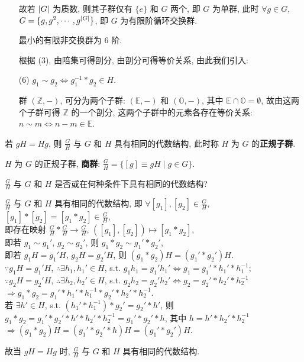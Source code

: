 \documentclass{note}
\begin{document}
\begin{itemize}
    故若 $\left\lvert G\right\rvert$ 为质数, 则其子群仅有 $\{e\}$ 和 $G$ 两个, 即 $G$ 为单群, 此时 $\forall g\in G$, $G=\{g,g^2,\cdots,g^{\left\lvert G\right\rvert}\}$, 即 $G$ 为有限阶循环交换群.

    最小的有限非交换群为 $6$ 阶.

    根据 (3), 由陪集可得剖分, 由剖分可得等价关系, 由此我们引入:
    \item[(6)] $g_1\sim g_2\Longleftrightarrow g_1^{-1}*g_2\in H$.
    \begin{eg}
        群 $(\mathbb{Z},-)$, 可分为两个子群: $(\mathbb{E},-)$ 和 $(\mathbb{O},-)$, 其中 $\mathbb{E}\cap\mathbb{O}=\emptyset$, 故由这两个子群可得 $\mathbb{Z}$ 的一个剖分, 这两个子群中的元素各存在等价关系: $n\sim m\Longleftrightarrow n-m\in\mathbb{E}$.
    \end{eg}
\end{itemize}

\begin{thm}[正规子群]
    若 $gH=Hg$, 则 $\frac{G}{H}$ 与 $G$ 和 $H$ 具有相同的代数结构, 此时称 $H$ 为 $G$ 的\textbf{正规子群}.
\end{thm}

\begin{df}[商群]
    $H$ 为 $G$ 的正规子群, \textbf{商群}: $\frac{G}{H}=\{[g]\equiv gH\mid g\in G\}$.
\end{df}

\begin{prob}
    $\frac{G}{H}$ 与 $G$ 和 $H$ 是否或在何种条件下具有相同的代数结构?
\end{prob}
\begin{ans}
    $\frac{G}{H}$ 与 $G$ 和 $H$ 具有相同的代数结构, 即 $\forall[g_1],[g_2]\in\frac{G}{H}$, $[g_1]*[g_2]=[g_1*g_2]\in\frac{G}{H}$,\\
    即存在映射 $\frac{G}{H}*\frac{G}{H}\rightarrow\frac{G}{H}$, $([g_1],[g_2])\mapsto[g_1*g_2]$,\\
    即若 $g_1\sim g_1'$, $g_2\sim g_2'$, 则 $g_1*g_2\sim g_1'*g_2'$,\\
    即若 $g_1H=g_1'H$, $g_2H=g_2'H$, 则 $(g_1*g_2)H=(g_1'*g_2')H$.\\
    $\because g_1H=g_1'H$, $\therefore\exists h_1,h_1'\in H$, s.t. $g_1h_1=g_1'h_1'\Longleftrightarrow g_1=g_1'*h_1'*h_1^{-1}$;\\
    $\because g_2H=g_2'H$, $\therefore\exists h_2,h_2'\in H$, s.t. $g_2h_2=g_2'h_2'\Longleftrightarrow g_2=g_2'*h_2'*h_2^{-1}$\\
    $\Longrightarrow g_1*g_2=g_1'*h_1'*h_1^{-1}*g_2'*h_2'*h_2^{-1}$.\\
    若 $\exists h'\in H$, s.t. $(h_1'*h_1^{-1})*g_2'=g_2'*h'$, 则 $g_1*g_2=g_1'*g_2'*h'*h_2'*h_2^{-1}=g_1'*g_2'*h$, 其中 $h=h'*h_2'*h_2^{-1}$\\
    $\Longrightarrow(g_1*g_2)H=(g_1'*g_2'*h)H=(g_1'*g_2')H$.

    故当 $gH=Hg$ 时, $\frac{G}{H}$ 与 $G$ 和 $H$ 具有相同的代数结构.
\end{ans}
\end{document}
